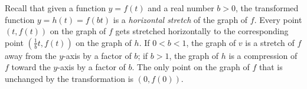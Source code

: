 \documentclass{ximera}
\begin{document}
Recall that given a function \(y = f(t)\) and a real number \(b > 0\), the transformed function \(y = h(t) = f(bt)\) is a \emph{horizontal stretch} of the graph of \(f\).  Every point \((t,f(t))\) on the graph of \(f\) gets stretched horizontally to the corresponding point \(\left(\frac{1}{b}t,f(t)\right)\) on the graph of \(h\).  If \(0 < b < 1\), the graph of \(v\) is a stretch of \(f\) away from the \(y\)-axis by a factor of \(b\); if \(b > 1\), the graph of \(h\) is a compression of \(f\) toward the \(y\)-axis by a factor of \(b\).  The only point on the graph of \(f\) that is unchanged by the transformation is \((0,f(0))\).%


%
%
%
\end{document}
